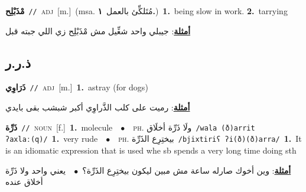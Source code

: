 \documentclass[10pt,a4paper,twoside]{article} %
\begin{document}
\begin{multicols}{2}
{\setlength\topsep{0pt}\textbf{\foreignlanguage{arabic}{مْذَبْلِح}}\ {\color{gray}\texttt{//}\color{black}}\ \textsc{adj}\ [m.]\ \color{gray}(msa. \foreignlanguage{arabic}{مُتَلكِّئ بالعمل}~\foreignlanguage{arabic}{\textbf{١.}})\color{black}\ \textbf{1.}~being slow in work.  \textbf{2.}~tarrying\  \begin{flushright}\color{gray}\foreignlanguage{arabic}{\textbf{\underline{\foreignlanguage{arabic}{أمثلة}}}: جيبلي واحد شغِّيل مش مْذَبْلِح زي اللي جبته قبل}\end{flushright}\color{black}} \vspace{2mm}

\vspace{-3mm}
\subsection*{\color{blue}\foreignlanguage{arabic}{ذ.ر.ر}\color{blue}{}} 

{\setlength\topsep{0pt}\textbf{\foreignlanguage{arabic}{ذَرَاوِي}}\ {\color{gray}\texttt{//}\color{black}}\ \textsc{adj}\ [m.]\ \textbf{1.}~astray (for dogs)\  \begin{flushright}\color{gray}\foreignlanguage{arabic}{\textbf{\underline{\foreignlanguage{arabic}{أمثلة}}}: رميت على كلب الذَّراوِي أكبر شبشب بقى بايدي}\end{flushright}\color{black}} \vspace{2mm}

{\setlength\topsep{0pt}\textbf{\foreignlanguage{arabic}{ذَرِّة}}\ {\color{gray}\texttt{//}\color{black}}\ \textsc{noun}\ [f.]\ \textbf{1.}~molecule\ \ $\bullet$\ \ \textsc{ph.} \color{gray} \foreignlanguage{arabic}{ولَا ذَرِّة أخلَاق}\color{black}\ {\color{gray}\texttt{/{\sffamily wala (ð)arrit ʔaxlaː(q)}/}\color{black}}\ \textbf{1.}~very rude\ \ $\bullet$\ \ \textsc{ph.} \color{gray} \foreignlanguage{arabic}{بيختِرِع الذَرِّة}\color{black}\ {\color{gray}\texttt{/{\sffamily bjixtiriʕ ʔi(ð)(ð)arra}/}\color{black}}\ \textbf{1.}~It is an idiomatic expression that is used whe sb spends a very long time doing sth\  \begin{flushright}\color{gray}\foreignlanguage{arabic}{\textbf{\underline{\foreignlanguage{arabic}{أمثلة}}}: وين أخوك صارله ساعة مش مبين ليكون بيختِرِع الذَرِّة؟\ $\bullet$\ \  يعني واحد ولا ذَرِّة أخلاق عنده}\end{flushright}\color{black}} \vspace{2mm}


\end{multicols}
\end{document}
